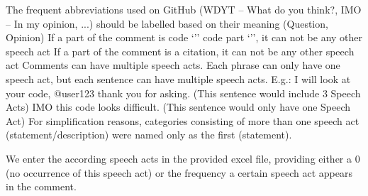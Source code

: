
The frequent abbreviations used on GitHub (WDYT – What do you think?, IMO – In my opinion, ...)
should be labelled based on their meaning (Question, Opinion)
If a part of the comment is code ‘’’ code part ‘’’, it can not be any other speech act
If a part of the comment is a citation, it can not be any other speech act
Comments can have multiple speech acts. Each phrase can only have one speech act, but each
sentence can have multiple speech acts.
E.g.:
I will look at your code, @user123 thank you for asking. (This sentence would include 3 Speech Acts)
IMO this code looks difficult. (This sentence would only have one Speech Act)
For simplification reasons, categories consisting of more than one speech act (statement/description)
were named only as the first (statement).

We enter the according speech acts in the provided excel file, providing either a 0 (no occurrence
of this speech act) or the frequency a certain speech act appears in the comment.



